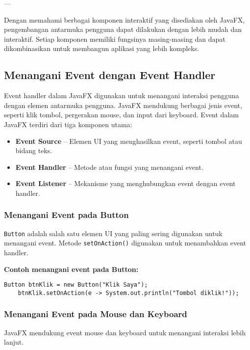---

Dengan memahami berbagai komponen interaktif yang disediakan oleh JavaFX, pengembangan antarmuka pengguna dapat dilakukan dengan lebih mudah dan interaktif. Setiap komponen memiliki fungsinya masing-masing dan dapat dikombinasikan untuk membangun aplikasi yang lebih kompleks.

\subsection{Menangani Event dengan Event Handler}

Event handler dalam JavaFX digunakan untuk menangani interaksi pengguna dengan elemen antarmuka pengguna. JavaFX mendukung berbagai jenis event, seperti klik tombol, pergerakan mouse, dan input dari keyboard. Event dalam JavaFX terdiri dari tiga komponen utama:

\begin{itemize}
	\item \textbf{Event Source} – Elemen UI yang menghasilkan event, seperti tombol atau bidang teks.
	\item \textbf{Event Handler} – Metode atau fungsi yang menangani event.
	\item \textbf{Event Listener} – Mekanisme yang menghubungkan event dengan event handler.
\end{itemize}

\subsubsection{Menangani Event pada Button}

\texttt{Button} adalah salah satu elemen UI yang paling sering digunakan untuk menangani event. Metode \texttt{setOnAction()} digunakan untuk menambahkan event handler.

\textbf{Contoh menangani event pada Button:}
\begin{lstlisting}[style=JavaStyle, caption=Menangani klik tombol dalam JavaFX]
	Button btnKlik = new Button("Klik Saya");
	btnKlik.setOnAction(e -> System.out.println("Tombol diklik!"));
\end{lstlisting}

\subsubsection{Menangani Event pada Mouse dan Keyboard}

JavaFX mendukung event mouse dan keyboard untuk menangani interaksi lebih lanjut.

